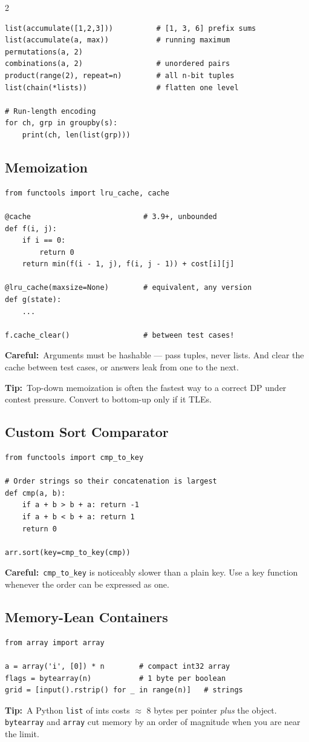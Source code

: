 \documentclass[10pt]{article}
\newcommand{\code}[1]{\texttt{\small #1}}
\newcommand{\tip}[1]{{\color{tipc}\footnotesize\textbf{Tip:}}~{\footnotesize #1}\par}
\newcommand{\warn}[1]{{\color{warnc}\footnotesize\textbf{Careful:}}~{\footnotesize #1}\par}
\begin{document}
\begin{multicols}{2}
\begin{lstlisting}
list(accumulate([1,2,3]))          # [1, 3, 6] prefix sums
list(accumulate(a, max))           # running maximum
permutations(a, 2)
combinations(a, 2)                 # unordered pairs
product(range(2), repeat=n)        # all n-bit tuples
list(chain(*lists))                # flatten one level

# Run-length encoding
for ch, grp in groupby(s):
    print(ch, len(list(grp)))
\end{lstlisting}

\subsection{Memoization}
\begin{lstlisting}
from functools import lru_cache, cache

@cache                          # 3.9+, unbounded
def f(i, j):
    if i == 0:
        return 0
    return min(f(i - 1, j), f(i, j - 1)) + cost[i][j]

@lru_cache(maxsize=None)        # equivalent, any version
def g(state):
    ...

f.cache_clear()                 # between test cases!
\end{lstlisting}
\warn{Arguments must be hashable --- pass tuples, never lists. And clear
the cache between test cases, or answers leak from one to the next.}
\tip{Top-down memoization is often the fastest way to a correct DP under
contest pressure. Convert to bottom-up only if it TLEs.}

\subsection{Custom Sort Comparator}
\begin{lstlisting}
from functools import cmp_to_key

# Order strings so their concatenation is largest
def cmp(a, b):
    if a + b > b + a: return -1
    if a + b < b + a: return 1
    return 0

arr.sort(key=cmp_to_key(cmp))
\end{lstlisting}
\warn{\code{cmp\_to\_key} is noticeably slower than a plain key. Use a
key function whenever the order can be expressed as one.}

\subsection{Memory-Lean Containers}
\begin{lstlisting}
from array import array

a = array('i', [0]) * n        # compact int32 array
flags = bytearray(n)           # 1 byte per boolean
grid = [input().rstrip() for _ in range(n)]   # strings
\end{lstlisting}
\tip{A Python \code{list} of ints costs $\approx$ 8 bytes per pointer
\emph{plus} the object. \code{bytearray} and \code{array} cut memory by
an order of magnitude when you are near the limit.}

\end{multicols}
\end{document}
